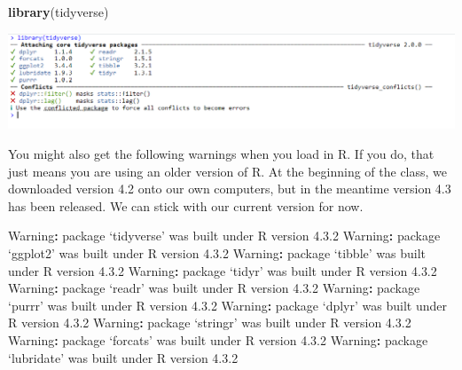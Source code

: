 \documentclass[
]{book}
\newenvironment{Shaded}{\begin{snugshade}}{\end{snugshade}}
\newcommand{\DecValTok}[1]{\textcolor[rgb]{0.00,0.00,0.81}{#1}}
\newcommand{\FloatTok}[1]{\textcolor[rgb]{0.00,0.00,0.81}{#1}}
\newcommand{\FunctionTok}[1]{\textcolor[rgb]{0.13,0.29,0.53}{\textbf{#1}}}
\newcommand{\NormalTok}[1]{#1}
\newcommand{\SpecialCharTok}[1]{\textcolor[rgb]{0.81,0.36,0.00}{\textbf{#1}}}
\begin{document}
\begin{Shaded}
\begin{Highlighting}[]
\FunctionTok{library}\NormalTok{(tidyverse)}
\end{Highlighting}
\end{Shaded}

\includegraphics{img/05-tidyverse-message.PNG}

You might also get the following warnings when you load in R. If you do, that just means you are using an older version of R. At the beginning of the class, we downloaded version 4.2 onto our own computers, but in the meantime version 4.3 has been released. We can stick with our current version for now.

\begin{Shaded}
\begin{Highlighting}[]
\NormalTok{Warning}\SpecialCharTok{:}\NormalTok{ package ‘tidyverse’ was built under R version }\DecValTok{4}\NormalTok{.}\FloatTok{3.2}
\NormalTok{Warning}\SpecialCharTok{:}\NormalTok{ package ‘ggplot2’ was built under R version }\DecValTok{4}\NormalTok{.}\FloatTok{3.2}
\NormalTok{Warning}\SpecialCharTok{:}\NormalTok{ package ‘tibble’ was built under R version }\DecValTok{4}\NormalTok{.}\FloatTok{3.2}
\NormalTok{Warning}\SpecialCharTok{:}\NormalTok{ package ‘tidyr’ was built under R version }\DecValTok{4}\NormalTok{.}\FloatTok{3.2}
\NormalTok{Warning}\SpecialCharTok{:}\NormalTok{ package ‘readr’ was built under R version }\DecValTok{4}\NormalTok{.}\FloatTok{3.2}
\NormalTok{Warning}\SpecialCharTok{:}\NormalTok{ package ‘purrr’ was built under R version }\DecValTok{4}\NormalTok{.}\FloatTok{3.2}
\NormalTok{Warning}\SpecialCharTok{:}\NormalTok{ package ‘dplyr’ was built under R version }\DecValTok{4}\NormalTok{.}\FloatTok{3.2}
\NormalTok{Warning}\SpecialCharTok{:}\NormalTok{ package ‘stringr’ was built under R version }\DecValTok{4}\NormalTok{.}\FloatTok{3.2}
\NormalTok{Warning}\SpecialCharTok{:}\NormalTok{ package ‘forcats’ was built under R version }\DecValTok{4}\NormalTok{.}\FloatTok{3.2}
\NormalTok{Warning}\SpecialCharTok{:}\NormalTok{ package ‘lubridate’ was built under R version }\DecValTok{4}\NormalTok{.}\FloatTok{3.2}
\end{Highlighting}
\end{Shaded}
\end{document}
